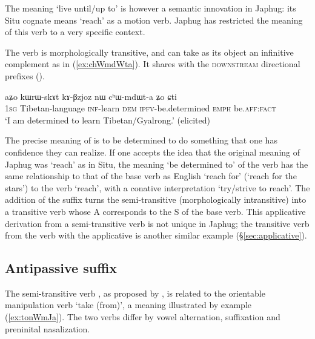 The meaning `live until/up to' is however a semantic innovation in Japhug: its Situ cognate  means `reach' as a motion verb. Japhug has restricted the meaning of this verb to a very specific context.

The verb  is morphologically transitive, and can take as its object an infinitive complement as in (\ref{ex:chWmdWta}). It shares with  the \textsc{downstream} directional prefixes ().

 \begin{exe}
\ex \label{ex:chWmdWta}
\gll aʑo kɯrɯ-skɤt kɤ-βzjoz nɯ cʰɯ-mdɯt-a ʑo ɕti \\
\textsc{1sg} Tibetan-language \textsc{inf}-learn \textsc{dem} \textsc{ipfv}-be.determined \textsc{emph} be.\textsc{aff}:\textsc{fact} \\
\glt `I am determined to learn Tibetan/Gyalrong.' (elicited)
\end{exe}

The precise meaning of   is to be determined to do something that one has confidence they can realize. If one accepts the idea that the original meaning of Japhug  was `reach' as in Situ, the meaning `be determined to' of the verb  has the same relationship to that of the base verb as English `reach for' (`reach for the stars') to the verb `reach', with a conative interpretation `try/strive to reach'.  The addition of the suffix  turns the semi-transitive (morphologically intransitive)  into a transitive verb whose A corresponds to the S of the base verb. This applicative derivation from a semi-transitive verb is not unique in Japhug; the transitive verb  from the verb  with the  applicative is another similar example (§\ref{sec:applicative}).

\subsection{Antipassive  suffix} \label{sec:antipassive.t}
The semi-transitive verb , 
as proposed by \citet[310]{gong18these}, is related to the orientable manipulation verb   `take (from)', a meaning illustrated by example (\ref{ex:tonWmJa}). The two verbs differ by vowel alternation,  suffixation and preninital nasalization.
 
